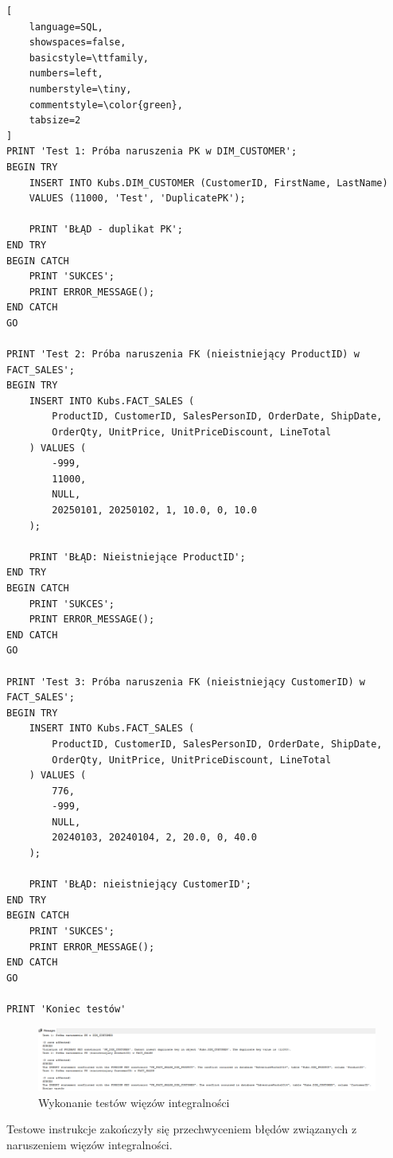 \documentclass[a4paper,12pt]{article}
\begin{document}
{\small
\begin{lstlisting}[
    language=SQL,
    showspaces=false,
    basicstyle=\ttfamily,
    numbers=left,
    numberstyle=\tiny,
    commentstyle=\color{green},
    tabsize=2
]
PRINT 'Test 1: Próba naruszenia PK w DIM_CUSTOMER';
BEGIN TRY
    INSERT INTO Kubs.DIM_CUSTOMER (CustomerID, FirstName, LastName)
    VALUES (11000, 'Test', 'DuplicatePK');

    PRINT 'BŁĄD - duplikat PK';
END TRY
BEGIN CATCH
    PRINT 'SUKCES';
    PRINT ERROR_MESSAGE();
END CATCH
GO

PRINT 'Test 2: Próba naruszenia FK (nieistniejący ProductID) w FACT_SALES';
BEGIN TRY
    INSERT INTO Kubs.FACT_SALES (
        ProductID, CustomerID, SalesPersonID, OrderDate, ShipDate,
        OrderQty, UnitPrice, UnitPriceDiscount, LineTotal
    ) VALUES (
        -999,
        11000,
        NULL,
        20250101, 20250102, 1, 10.0, 0, 10.0
    );

    PRINT 'BŁĄD: Nieistniejące ProductID';
END TRY
BEGIN CATCH
    PRINT 'SUKCES';
    PRINT ERROR_MESSAGE();
END CATCH
GO

PRINT 'Test 3: Próba naruszenia FK (nieistniejący CustomerID) w FACT_SALES';
BEGIN TRY
    INSERT INTO Kubs.FACT_SALES (
        ProductID, CustomerID, SalesPersonID, OrderDate, ShipDate,
        OrderQty, UnitPrice, UnitPriceDiscount, LineTotal
    ) VALUES (
        776,
        -999,
        NULL,
        20240103, 20240104, 2, 20.0, 0, 40.0
    );

    PRINT 'BŁĄD: nieistniejący CustomerID';
END TRY
BEGIN CATCH
    PRINT 'SUKCES';
    PRINT ERROR_MESSAGE();
END CATCH
GO

PRINT 'Koniec testów'
\end{lstlisting}
}

\begin{figure}[H]
    \centering
    \includegraphics[width=1.0\textwidth]{images/4_2.png}
    \caption{Wykonanie testów więzów integralności}
\end{figure}

Testowe instrukcje zakończyły się przechwyceniem błędów związanych z naruszeniem więzów integralności.

\printbibliography
\end{document}
